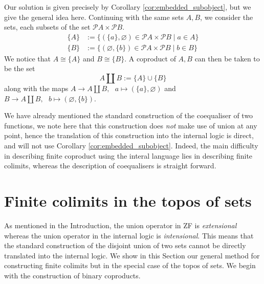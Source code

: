 \documentclass{birkjour}
\theoremstyle{plain}
\theoremstyle{definition}
\newcommand{\call}[1]{\mathcal{#1}}
\newcommand{\lto}{\longrightarrow}
\begin{document}
	Our solution is given precisely by Corollary \ref{cor:embedded_subobject}, but we give the general idea here. Continuing with the same sets $A,B$, we consider the sets, each subsets of the set $\call{P}A \times \call{P}B$.
	\begin{align}
		\lbrace A \rbrace &:= \big\lbrace (\lbrace a \rbrace,\varnothing) \in \call{P}A \times \call{P}B \mid a \in A \rbrace\\
		\lbrace B \big\rbrace &:= \big\lbrace (\varnothing, \lbrace b \rbrace) \in \call{P}A \times \call{P}B \mid b \in B \big\rbrace
	\end{align}
	We notice that $A \cong \lbrace A \rbrace$ and $B \cong \lbrace B \rbrace$. A coproduct of $A,B$ can then be taken to be the set
	\begin{equation}
		A \coprod B := \lbrace A \rbrace \cup \lbrace B \rbrace
	\end{equation}
	along with the maps $A \lto A \coprod B,\text{ }a \longmapsto (\lbrace a \rbrace, \varnothing)$ and $B \lto A \coprod B,\text{ }b \longmapsto (\varnothing, \lbrace b \rbrace)$.
	
	We have already mentioned the standard construction of the coequaliser of two functions, we note here that this construction does \emph{not} make use of union at any point, hence the translation of this construction into the internal logic is direct, and will not use Corollary \ref{cor:embedded_subobject}. Indeed, the main difficulty in describing finite coproduct using the interal language lies in describing finite colimits, whereas the description of coequalisers is straight forward.
	
	\section{Finite colimits in the topos of sets}\label{sec:in_sets}
	As mentioned in the Introduction, the union operator in ZF is \emph{extensional} whereas the union operator in the internal logic is \emph{intensional}. This means that the standard construction of the disjoint union of two sets cannot be directly translated into the internal logic. We show in this Section our general method for constructing finite colimits but in the special case of the topos of sets. We begin with the construction of binary coproducts.
	
\end{document}
